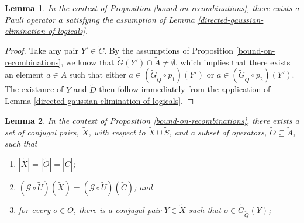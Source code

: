 \documentclass[twocolumn,showpacs,preprintnumbers,amsmath,amssymb,nofootinbib,pra,floatfix]{revtex4-1}
\newtheorem{lemma}{Lemma}
\newcommand{\set}{\tilde}
\newcommand{\genfun}{\mathcal{G}}
\begin{document}
\begin{lemma}
\label{undirected-gaussian-elimination-of-logicals}
In the context of Proposition \ref{bound-on-recombinations}, there exists a Pauli operator $a$ satisfying the assumption of Lemma \ref{directed-gaussian-elimination-of-logicals}.
\end{lemma}

\begin{proof}
Take any pair $Y'\in\set C$.  By the assumptions of Proposition \ref{bound-on-recombinations}, we know that $\set G(Y')\cap \set A \ne \emptyset$, which implies that there exists an element $a\in A$ such that either $a\in (\set G_{\set Q}\circ p_1)(Y')$ or $a\in (\set G_{\set Q}\circ p_2)(Y')$.  The existance of $Y$ and $\set D$ then follow immediately from the application of Lemma \ref{directed-gaussian-elimination-of-logicals}.
\end{proof}
\begin{lemma}
\label{elimination-to-create-subset}
In the context of Proposition \ref{bound-on-recombinations}, there exists a set of conjugal pairs, $\set X$, with respect to $\set X\cup\set S$, and a subset of operators, $\set O\subseteq \set A$, such that
\begin{enumerate}
\item $|\set X|=|\set O|=|\set C|$;
\item $(\genfun\circ\set U)(\set X)=(\genfun\circ\set U)(\set C)$; and
\item for every $o\in\set O$, there is a conjugal pair $Y\in\set X$ such that $o\in\set G_{\set Q}(Y)$;
\end{enumerate}
\end{lemma}
\end{document}
